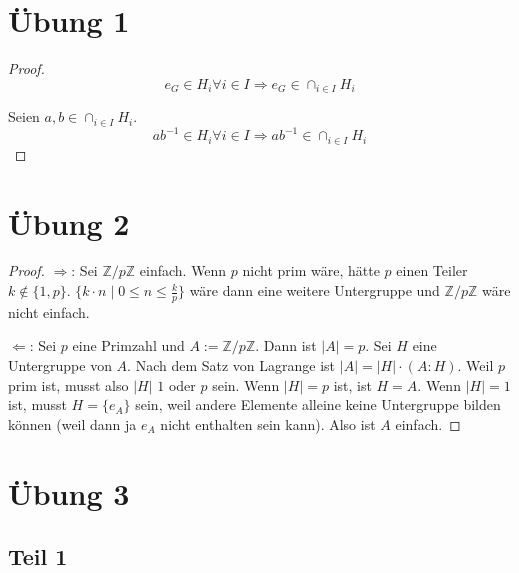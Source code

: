 \documentclass[10pt,a4paper]{article}
\begin{document}
\section{Übung 1}

\begin{proof}
  \begin{equation}
    e_{G} \in H_{i} \forall i \in I \Rightarrow e_{G} \in \cap_{i \in I} H_{i}
  \end{equation}

  Seien $a, b \in \cap_{i \in I} H_{i}$.
  \begin{equation}
    ab^{-1} \in H_{i} \forall i \in I \Rightarrow ab^{-1} \in \cap_{i \in I} H_{i}
  \end{equation}
\end{proof}

\section{Übung 2}

\begin{proof}
  $\Rightarrow$:
  Sei $\mathbb{Z} / p \mathbb{Z}$ einfach.
  Wenn $p$ nicht prim wäre, hätte $p$ einen Teiler $k \not\in \{ 1, p \}$.
  $\{ k \cdot n \mid 0 \le n \le \frac{k}{p} \}$ wäre dann eine weitere Untergruppe und $\mathbb{Z} / p \mathbb{Z}$ wäre nicht einfach.

  $\Leftarrow$:
  Sei $p$ eine Primzahl und $A := \mathbb{Z} / p \mathbb{Z}$.
  Dann ist $|A| = p$.
  Sei $H$ eine Untergruppe von $A$.
  Nach dem Satz von Lagrange ist $|A| = |H| \cdot (A : H)$.
  Weil $p$ prim ist, musst also $|H|$ $1$ oder $p$ sein.
  Wenn $|H| = p$ ist, ist $H = A$.
  Wenn $|H| = 1$ ist, musst $H = \{ e_{A} \}$ sein, weil andere Elemente alleine keine Untergruppe bilden können (weil dann ja $e_{A}$ nicht enthalten sein kann).
  Also ist $A$ einfach.
\end{proof}

\section{Übung 3}

\subsection{Teil 1}
\end{document}
